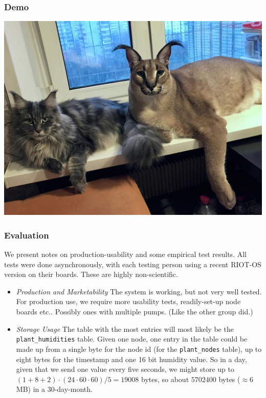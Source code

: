 \documentclass[10pt, xcolor=svgnames]{beamer}
\begin{document}
\begin{frame}
    \frametitle{Demo}

    \includegraphics[width=\linewidth]{img/60b4cf3885600a50dd341bb2.jpg}
\end{frame}

\begin{frame}
    \frametitle{Evaluation}

    We present notes on production-usability and some empirical test results. All tests were done asynchronously, with each testing person using a recent RIOT-OS version on their boards. These are highly non-scientific.

    \begin{itemize}
        \item \emph{Production and Marketability} The system is working, but not very well tested. For production use, we require more usability tests, readily-set-up node boards etc.. Possibly ones with multiple pumps. (Like the other group did.)
        \item \emph{Storage Usage} The table with the most entries will most likely be the \texttt{plant\_humidities} table. Given one node, one entry in the table could be made up from a single byte for the node id (for the \texttt{plant\_nodes} table), up to eight bytes for the timestamp and one 16 bit humidity value. So in a day, given that we send one value every five seconds, we might store up to \((1+8+2) \cdot (24 \cdot 60 \cdot 60) / 5 = 19008\) bytes, so about \(5702400\) bytes (\(\approx 6\)MB) in a 30-day-month.
    \end{itemize}
\end{frame}
\end{document}
